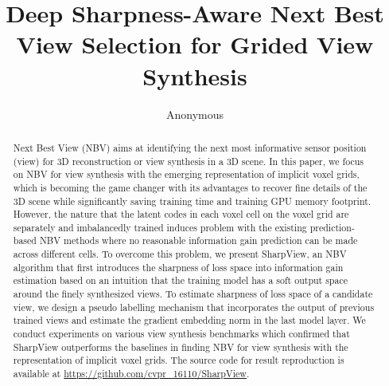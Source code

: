 \documentclass[10pt,twocolumn,letterpaper]{article}
\title{Deep Sharpness-Aware Next Best View Selection for Grided View Synthesis}
\author{Anonymous}
\begin{document}
\maketitle
\begin{abstract}
Next Best View (NBV) aims at identifying the next most informative sensor position (view) for 3D reconstruction or view synthesis in a 3D scene.
In this paper, we focus on NBV for view synthesis with the emerging representation of implicit voxel grids, which is becoming the game changer with its advantages to recover fine details of the 3D scene while significantly saving training time and training GPU memory footprint.
However, the nature that the latent codes in each voxel cell on the voxel grid are separately and imbalancedly trained induces problem with the existing prediction-based NBV methods where no reasonable information gain prediction can be made across different cells.
To overcome this problem, we present SharpView, an NBV algorithm that first introduces the sharpness of loss space into information gain estimation based on an intuition that the training model has a soft output space around the finely synthesized views.
To estimate sharpness of loss space of a candidate view, we design a pseudo labelling mechanism that incorporates the output of previous trained views and estimate the gradient embedding norm in the last model layer.
We conduct experiments on various view synthesis benchmarks which confirmed that SharpView outperforms the baselines in finding NBV for view synthesis with the representation of implicit voxel grids.
The source code for result reproduction is available at \url{https://github.com/cvpr_16110/SharpView}.
\end{abstract}






{
    \small
    
    
}

% 
\end{document}
